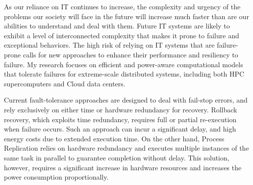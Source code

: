 As our reliance on IT continues to increase, the complexity and urgency of the problems our society will face in the future will increase much faster than are our abilities to understand and deal with them. Future IT systems are likely to exhibit a level of interconnected complexity that makes it prone to failure and exceptional behaviors. The high risk of relying on IT systems that are failure-prone calls for new approaches to enhance their performance and resiliency to failure. My research focuses on efficient and power-aware computational models that tolerate failures for extreme-scale distributed systems, including both HPC supercomputers and Cloud data centers.

Current fault-tolerance approaches are designed to deal with fail-stop errors, and rely exclusively on either time or hardware redundancy for recovery. Rollback recovery, which
exploits time redundancy, requires full or partial re-execution when failure occurs. 
Such an approach
can incur a significant delay, %
and high energy costs due to extended execution time.
On the other hand, Process Replication relies on hardware redundancy and executes multiple
instances of the same task in parallel to guarantee completion without delay.  %
This solution, however, requires a significant increase in hardware resources and increases the power consumption proportionally. 


